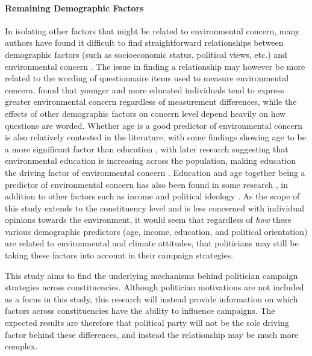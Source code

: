 \documentclass[preprint]{elsarticle} %
\begin{document}
\paragraph{Remaining Demographic Factors}

In isolating other factors that might be related to environmental concern, many authors have found it difficult to find straightforward relationships between demographic factors (such as socioeconomic status, political views, etc.) and environmental concern \citep{dietzSocialStructuralSocial1998,samdahlSocialDeterminantsEnvironmental1989,giffordPersonalSocialFactors2014}. The issue in finding a relationship may however be more related to the wording of questionnaire items used to measure environmental concern. \citet{klinebergDemographicPredictorsEnvironmental1998} found that younger and more educated individuals tend to express greater environmental concern regardless of measurement differences, while the effects of other demographic factors on concern level depend heavily on how questions are worded. Whether age is a good predictor of environmental concern is also relatively contested in the literature, with some findings showing age to be a more significant factor than education \citep{buttelAgeEnvironmentalConcern1979}, with later research suggesting that environmental education is increasing across the population, making education the driving factor of environmental concern \citep{howellChangingFaceEnvironmental1992}. Education and age together being a predictor of environmental concern has also been found in some research \citep{arcuryEnvironmentalWorldviewResponse1990}, in addition to other factors such as income \citep{gambaFactorsInfluencingCommunity1994} and political ideology \citep{dunlapImpactPoliticalOrientation1975}. As the scope of this study extends to the constituency level and is less concerned with individual opinions towards the environment, it would seem that regardless of \textit{how} these various demographic predictors (age, income, education, and political orientation) are related to environmental and climate attitudes, that politicians may still be taking these factors into account in their campaign strategies.

This study aims to find the underlying mechanisms behind politician campaign strategies across constituencies. Although politician motivations are not included as a focus in this study, this research will instead provide information on which factors across constituencies have the ability to influence campaigns. The expected results are therefore that political party will not be the sole driving factor behind these differences, and instead the relationship may be much more complex. 
	
\end{document}

